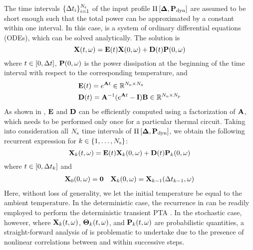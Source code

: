 The time intervals $\{ \Delta t_i \}_{i = 1}^{N_\text{s}}$ of the input profile $\prof{\mP_\dyn}$ are assumed to be short enough such that the total power can be approximated by a constant within one interval. In this case,  is a system of ordinary differential equations (ODEs), which can be solved analytically. The solution is
\begin{equation} \elabel{ode-solution}
  \vX(\t, \o) = \mE(\t) \vX(0, \o) + \mD(\t) \vP(0, \o)
\end{equation}
where $t \in [0, \Delta t]$, $\mathbf{P}(0, \omega)$ is the power dissipation at the beginning of the time interval with respect to the corresponding temperature, and
\begin{align*}
  & \mE(\t) = e^{\mA \t} \in \real^{\nodes \times \nodes} \\
  & \mD(\t) = \mA^{-1} (e^{\mA \t} - \mI) \mB \in \real^{\nodes \times \cores}
\end{align*}
As shown in \cite{ukhov2012}, $\mE$ and $\mD$ can be efficiently computed using a factorization of $\mA$, which needs to be performed only once for a particular thermal circuit. Taking into consideration all $N_\text{s}$ time intervals of $\prof{\mP_\dyn}$, we obtain the following recurrent expression for $k \in \{ 1, \dotsc, N_\text{s} \}$:
\begin{equation} \elabel{recurrence}
  \vX_k(\t, \o) = \mE(\t) \vX_k(0, \o) + \mD(\t) \vP_k(0, \o)
\end{equation}
where $t \in [ 0, \Delta t_k ]$ and
\begin{align*}
  & \mathbf{X}_0(0, \omega) = \mathbf{0} & \mathbf{X}_k(0, \omega) = \mathbf{X}_{k - 1}(\Delta t_{k - 1}, \omega)
\end{align*}
Here, without loss of generality, we let the initial temperature be equal to the ambient temperature. In the deterministic case, the recurrence in  can be readily employed to perform the deterministic transient PTA \cite{ukhov2012}. In the stochastic case, however, where $\mathbf{X}_k(t, \omega)$, ${\boldsymbol\Theta}_k(t, \omega)$, and $\mathbf{P}_k(t, \omega)$ are probabilistic quantities, a straight-forward analysis of  is problematic to undertake due to the presence of nonlinear correlations between and within successive steps.
